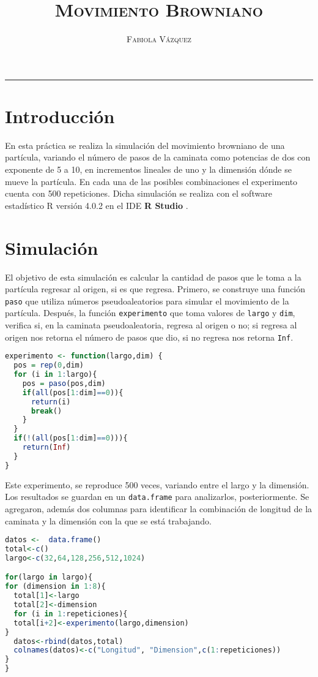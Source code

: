 \documentclass[12pt,letterpaper]{article}
\title{\textsc{Movimiento Browniano}}
\author{\textsc{Fabiola Vázquez}}
\begin{document}
\maketitle
\hrule
\section{Introducción}

En esta práctica se realiza la simulación del movimiento browniano de una partícula, variando el número de pasos de la caminata como potencias de dos con exponente de 5 a 10, en incrementos lineales de uno y la dimensión dónde se mueve la partícula. En cada una de las posibles combinaciones el experimento cuenta con 500 repeticiones. Dicha simulación se realiza con el software estadístico R versión 4.0.2 \cite{R} en el IDE \textbf{R Studio} \cite{rstudio}.  

\section{Simulación}
El objetivo de esta simulación es calcular la cantidad de pasos que le toma a la partícula regresar al origen, si es que regresa. Primero, se construye una función \texttt{paso} que utiliza números pseudoaleatorios para simular el movimiento de la partícula. Después, la función \texttt{experimento} que toma valores de \texttt{largo} y \texttt{dim}, verifica si, en la caminata pseudoaleatoria, regresa al origen o no; si regresa al origen nos retorna el número de pasos que dio, si no regresa nos retorna \texttt{Inf}. 

\begin{lstlisting}[language=R]
experimento <- function(largo,dim) {
  pos = rep(0,dim)
  for (i in 1:largo){
    pos = paso(pos,dim)
    if(all(pos[1:dim]==0)){
      return(i)
      break()
    }
  }
  if(!(all(pos[1:dim]==0))){
    return(Inf)
  }
}
\end{lstlisting}
Este experimento, se reproduce 500 veces, variando entre el largo y la dimensión. Los resultados se guardan en un \texttt{data.frame} para analizarlos, posteriormente. Se agregaron, además dos columnas para identificar la combinación  de longitud de la caminata y la dimensión con la que se está trabajando.
\begin{lstlisting}[language=R]
datos <-  data.frame()
total<-c()
largo<-c(32,64,128,256,512,1024)

for(largo in largo){
for (dimension in 1:8){
  total[1]<-largo
  total[2]<-dimension
  for (i in 1:repeticiones){
  total[i+2]<-experimento(largo,dimension)
}
  datos<-rbind(datos,total)
  colnames(datos)<-c("Longitud", "Dimension",c(1:repeticiones))
}
}
\end{lstlisting}
\end{document}
